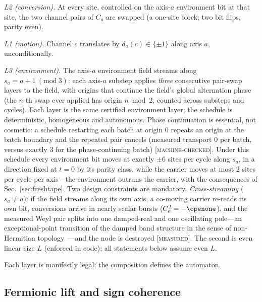 \documentclass[aps,prd,twocolumn,superscriptaddress,nofootinbib,floatfix]{revtex4-2}
\newcommand{\evM}{\textnormal{\textsc{[machine-checked]}}}
\newcommand{\evX}{\textnormal{\textsc{[measured]}}}
\begin{document}
\emph{L2 (conversion).} At every site, controlled on the axis-$a$
environment bit at that site, the two channel pairs of $C_a$ are swapped
(a one-site block; two bit flips, parity even).

\emph{L1 (motion).} Channel $c$ translates by $d_a(c)\in\{\pm1\}$ along
axis $a$, unconditionally.

\emph{L3 (environment).} The axis-$a$ environment field streams along
$s_a=a{+}1\ (\mathrm{mod}\ 3)$: each axis-$a$ substep applies
\emph{three} consecutive pair-swap layers to the field, with origins
that continue the field's global alternation phase (the $n$-th swap ever
applied has origin $n\bmod2$, counted across substeps and cycles).
Each layer is the same certified environment layer; the schedule is
deterministic, homogeneous and autonomous. Phase continuation is
essential, not cosmetic: a schedule restarting each batch at origin $0$
repeats an origin at the batch boundary and the repeated pair cancels
(measured transport $0$ per batch, versus exactly $3$ for the
phase-continuing batch) \evM{}. Under this schedule every environment
bit moves at exactly $\pm6$ sites per cycle along $s_a$, in a direction
fixed at $t=0$ by its parity class, while the carrier moves at most $2$
sites per cycle per axis---the environment outruns the carrier, with the
consequences of Sec.~\ref{sec:freshtape}. Two design constraints are
mandatory. \emph{Cross-streaming} ($s_a\neq a$): if the field streams
along its own axis, a co-moving carrier re-reads its own bit,
conversions arrive in nearly scalar bursts ($C_a^2=-\openone$), and the
measured Weyl pair splits into one damped-real and one oscillating
pole---an exceptional-point transition of the damped band structure in
the sense of non-Hermitian topology~\cite{Bergholtz}---and the node is
destroyed \evX{}. The second is even linear size $L$ (enforced in
code); all statements below assume even $L$.

Each layer is manifestly legal; the composition defines the automaton.

\subsection{Fermionic lift and sign coherence}
\end{document}
